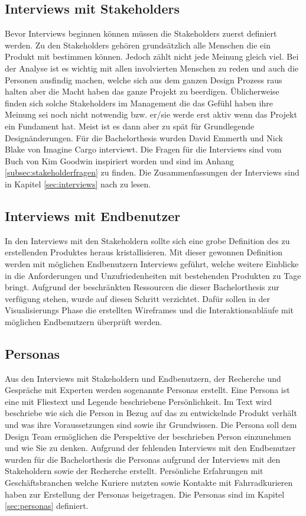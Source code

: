 \subsection{Interviews mit Stakeholders}
Bevor Interviews beginnen können müssen die Stakeholders zuerst definiert werden. Zu den Stakeholders gehören grundsätzlich alle Menschen die ein Produkt mit bestimmen können. Jedoch zählt nicht jede Meinung gleich viel. Bei der Analyse ist es wichtig mit allen involvierten Menschen zu reden und auch die Personen ausfindig machen, welche sich aus dem ganzen Design Prozess raus halten aber die Macht haben das ganze Projekt zu beerdigen. Üblicherweise finden sich solche Stakeholders im Management die das Gefühl haben ihre Meinung sei noch nicht notwendig bzw. er/sie werde erst aktiv wenn das Projekt ein Fundament hat. Meist ist es dann aber zu spät für Grundlegende Designänderungen. Für die Bachelorthesis wurden David Emmerth und Nick Blake von Imagine Cargo interviewt. Die Fragen für die Interviews sind vom Buch von Kim Goodwin inspiriert worden\citep[Kapitel 5]{goodwin2011designing} und sind im Anhang \ref{subsec:stakeholderfragen} zu finden. Die Zusammenfassungen der Interviews sind in Kapitel \ref{sec:interviews} nach zu lesen.

\subsection{Interviews mit Endbenutzer}
In den Interviews mit den Stakeholdern sollte sich eine grobe Definition des zu erstellenden Produktes heraus kristallisieren. Mit dieser gewonnen Definition werden mit möglichen Endbenutzern Interviews geführt, welche weitere Einblicke in die Anforderungen und Unzufriedenheiten mit bestehenden Produkten zu Tage bringt. Aufgrund der beschränkten Ressourcen die dieser Bachelorthesis zur verfügung stehen, wurde auf diesen Schritt verzichtet. Dafür sollen in der Visualisierungs Phase die erstellten Wireframes und die Interaktionsabläufe mit möglichen Endbenutzern überprüft werden.

\subsection{Personas}
Aus den Interviews mit Stakeholdern und Endbenutzern, der Recherche und Gespräche mit Experten werden sogenannte Personas erstellt. Eine Persona ist eine mit Fliestext und Legende beschriebene Persönlichkeit. Im Text wird beschriebe wie sich die Person in Bezug auf das zu entwickelnde Produkt verhält und was ihre Voraussetzungen sind sowie ihr Grundwissen. Die Persona soll dem Design Team ermöglichen die Perspektive der beschrieben Person einzunehmen und wie Sie zu denken. Aufgrund der fehlenden Interviews mit den Endbenutzer wurden für die Bachelorthesis die Personas aufgrund der Interviews mit den Stakeholdern sowie der Recherche erstellt. Persönliche Erfahrungen mit Geschäftsbranchen welche Kuriere nutzten sowie Kontakte mit Fahrradkurieren haben zur Erstellung der Personas beigetragen. Die Personas sind im Kapitel \ref{sec:personas} definiert.

